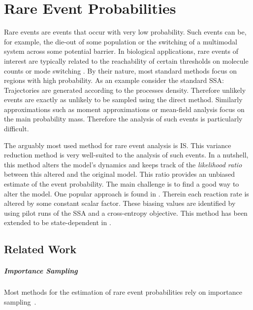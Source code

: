 \chapter{Rare Event Probabilities}\label{ch:is}
Rare events are events that occur with very low probability.
Such events can be, for example, the die-out of some population or the switching of a multimodal system across some potential barrier.
In biological applications, rare events of interest are typically related to the reachability of certain thresholds on molecule counts  or mode switching \parencite{strasser2012stability}.
By their nature, most standard methods focus on regions with high probability.
As an example consider the standard \ac{SSA}:
Trajectories are generated according to the processes density.
Therefore unlikely events are exactly as unlikely to be sampled using the direct method.
Similarly approximations such as moment approximations or mean-field analysis focus on the main probability mass.
Therefore the analysis of such events is particularly difficult.

The arguably most used method for rare event analysis is \acf{IS}.
This variance reduction method is very well-suited to the analysis of such events.
In a nutshell, this method alters the model's dynamics and keeps track of the \emph{likelihood ratio} between this altered and the original model.
This ratio provides an unbiased estimate of the event probability.
The main challenge is to find a good way to alter the model.
One popular approach is found in  \parencite{kuwahara2008efficient,daigle2011automated}.
Therein each reaction rate is altered by some constant scalar factor.
These biasing values are identified by using pilot runs of the \ac{SSA} and a cross-entropy objective.
This method has been extended to be state-dependent in \citet{roh2011state}.

\section{Related Work}
\paragraph{Importance Sampling}
Most methods for the estimation of rare event probabilities  rely on  importance sampling~\parencite{kuwahara2008efficient,daigle2011automated}.

